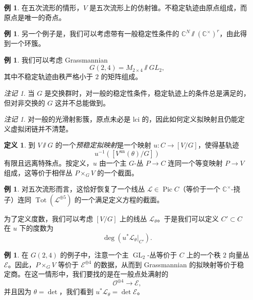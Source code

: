 \documentclass{amsart}
\theoremstyle{definition}
\newtheorem{defn}[thm]{定义}
\newtheorem{exm}[thm]{例}
\theoremstyle{remark}
\newtheorem{rmk}[thm]{注记}
\theoremstyle{plain}
\theoremstyle{definition}
\theoremstyle{remark}
\newcommand{\C}{\mathbb{C}}
\newcommand{\mc}[1]{\mathcal{#1}}
\newcommand{\mr}[1]{\mathrm{#1}}
\newcommand{\on}[1]{\operatorname{#1}}
\newcommand{\1}{\mathbf{1}}
\newcommand{\2}{\mathbf{2}}
\newcommand{\3}{\mathbf{3}}
\DeclareMathOperator{\Pic}{Pic}
\begin{document}
\begin{exm}
    在五次流形的情形，\(V\) 是五次流形上的仿射锥。不稳定轨迹由原点组成，而原点是唯一的奇点。
\end{exm}

\begin{exm}
    另一个例子是，我们可以考虑带有一般稳定性条件的 \(\C^N \sslash (\C^{\times})^r\)，由此得到一个环簇。
\end{exm}

\begin{exm}
    我们可以考虑 Grassmannian
    \[ G(2,4) = M_{2\times 4} \sslash GL_2, \]
    其中不稳定轨迹由秩严格小于 \(2\) 的矩阵组成。
\end{exm}

\begin{rmk}
    当 \(G\) 是交换群时，对一般的稳定性条件，稳定轨迹上的条件总是满足的，但对非交换的 \(G\) 这并不总能做到。
\end{rmk}

\begin{rmk}
    对一般的光滑射影簇，原点未必是 lci 的，因此如何定义拟映射且仍能定义虚拟闭链并不清楚。
\end{rmk}

\begin{defn}
    到 \(V \sslash G\) 的一个\textit{预稳定拟映射}是一个映射 \(u \colon C \to [V/G]\)，使得基轨迹
    \[ u^{-1}([V^{\mr{un}}(\theta) / G]) \]
    有限且远离特殊点。按定义，\(u\) 由一个主 \(G\)-丛 \(P \to C\) 连同一个等变映射 \(P \to V\) 组成，这等价于相伴丛 \(P \times_G V\) 的一个截面。 
\end{defn}

\begin{exm}
    对五次流形而言，这恰好恢复了一个线丛 \(\mc{L} \in \Pic C\)（等价于一个 \(\C^{\times}\)-挠子）连同 \(\on{Tot}(\mc{L}^{\oplus 5})\) 的一个满足定义方程的截面。
\end{exm}

为了定义度数，我们可以考虑 \([V/G]\) 上的线丛 \(\mc{L}_{\theta}\)。于是我们可以定义 \(C' \subset C\) 在 \(u\) 下的度数为
\[ \deg (u^* \mc{L}_{\theta}|_{C'}). \]

\begin{exm}
    在 \(G(2,4)\) 的例子中，注意一个主 \(\on{GL}_2\)-丛等价于 \(C\) 上的一个秩 \(2\) 向量丛 \(\mc{E}\)。因此，\(P \times_G V\) 等价于 \(\mc{E}^{\oplus 4}\) 的数据，从而到 Grassmannian 的拟映射等价于稳定商。在这一情形中，我们要找的是在一般点处满射的
    \[ \mc{O}^{\oplus 4} \to \mc{E}, \]
    并且因为 \(\theta = \det\)，我们看到 \(u^* \mc{L}_{\theta} = \det \mc{E}\)。
\end{exm}
\end{document}

